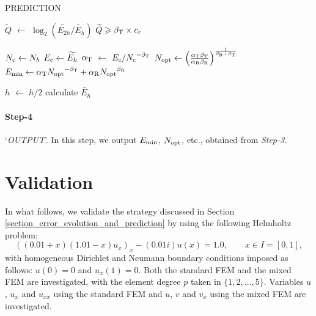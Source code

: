 \documentclass[review,3p]{elsarticle}
\begin{document}
\vspace{0.2cm}
\begin{algorithm}[H]
\caption{PREDICTION}			%
\label{block_PREDICTION}
    {
        $\widetilde{Q}$ $\gets$ $\log _2 \left( {\widetilde {E_{2h}}}/{\widetilde {E_{h}}} \right)$\;
        \eIf
        {
            $\widetilde{Q} \geqslant \beta_{\rm T} \times c_r$
        }
        {
            $N_{\rm c} \gets N_h$\;
            $E_{\rm c} \gets \widetilde {E_{h}}$\;
            $\alpha_{\rm T}$ $\gets$ ${E_{\rm c}}/{N_{\rm c}}^{- \beta_{\rm T}}$\;
            $N_{\rm opt} \gets \left( \frac{\alpha_{\rm T} \beta_{\rm T}}{\alpha _{\rm R} \beta_{\rm R}} \right)^{\frac{1}{\beta_{\rm R} + \beta_{\rm T}}}$\;
            $E_{\rm min} \gets \alpha_{\rm T} {N_{\rm opt}}^{- {\beta _{\rm T}}} + \alpha_{\rm R} {N_{\rm opt}}^{{\beta _{\rm R}}}$\;

        }
        {
            $h$ $\gets$ $h/2$\;
            calculate $\widetilde {E_{h}}$\;
        }
	}    
\end{algorithm}

\paragraph{Step-4} `\textit{OUTPUT}'. In this step, we output $E_{\rm min}$, $N_{\rm opt}$, etc., obtained from \textit{Step-3}.

\section{Validation}		\label{section_validation}

In what follows, we validate the strategy discussed in Section \ref{section_error_evolution_and_prediction} by using the following Helmholtz problem:
\begin{equation}
  \left((0.01+x)(1.01-x) u_x \right)_x -(0.01i) u(x) = 1.0,\qquad x \in I = [0,1],	\label{1D_Helmholtz_equation_application}
\end{equation}
with homogeneous Dirichlet and Neumann boundary conditions imposed as follows: $u(0)=0$ and $u_x(1)=0$.
Both the standard FEM and the mixed FEM are investigated, with the element degree $p$ taken in $\{1, 2, \ldots, 5\}$. Variables $u$, $u_x$ and $u_{xx}$ using the standard FEM and $u$, $v$ and $v_x$ using the mixed FEM are investigated.
\end{document}
